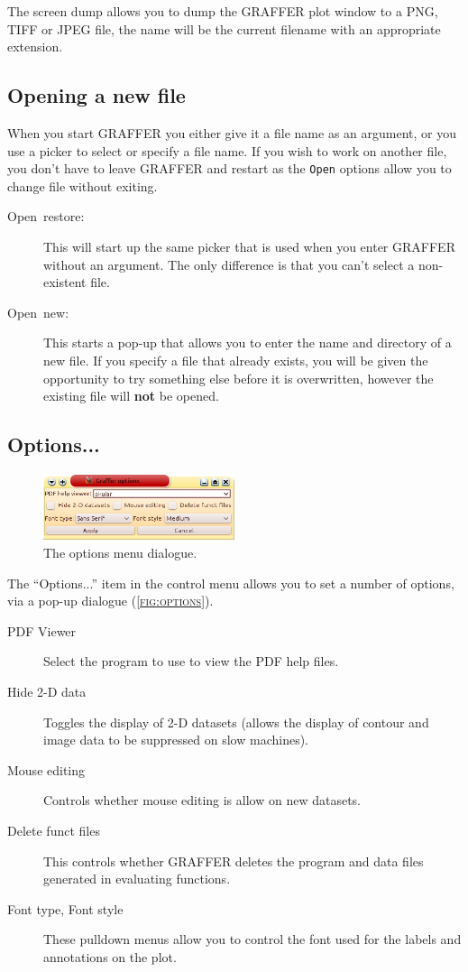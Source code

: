 \documentclass[11pt,twoside,english]{article}
\begin{document}
The screen dump allows you to dump the GRAFFER plot window to a PNG,
TIFF or JPEG file, the name will be the current filename with an
appropriate extension.


\subsection{Opening a new file}

When you start GRAFFER you either give it a file name as an argument,
or you use a picker to select or specify a file name. If you wish to
work on another file, you don't have to leave GRAFFER and restart as
the \texttt{Open} options allow you to change file without exiting.

\begin{description}
\item [Open~restore:]This will start up the same picker that is used
  when you enter GRAFFER without an argument. The only difference is
  that you can't select a non-existent file.
\item [Open~new:]This starts a pop-up that allows you to enter the name
  and directory of a new file. If you specify a file that already
  exists, you will be given the opportunity to try something else
  before it is overwritten, however the existing file will \textbf{not}
  be opened.
\end{description}

\subsection{Options...}
\label{sec:options}

\begin{figure}
  \centering
  \includegraphics[width=0.5\textwidth]{options}
  \caption{The options menu dialogue.}
  \label{fig:options}
\end{figure}
The ``Options...'' item in the control menu allows you to set a number
of options, via a pop-up dialogue (\textsc{\autoref{fig:options}}).

\begin{description}
\item[PDF Viewer] Select the program to use to view the PDF help files.
\item[Hide 2-D data] Toggles the display of 2-D datasets (allows the
  display of contour and image data to be suppressed on slow machines).
\item[Mouse editing] Controls whether mouse editing is allow on
  new datasets.
\item[Delete funct files] This controls whether GRAFFER deletes the
  program and data files generated in evaluating functions.

\item[Font type, Font style] These pulldown menus allow you to control
  the font used for the labels and annotations on the plot.
\end{description}
\end{document}

